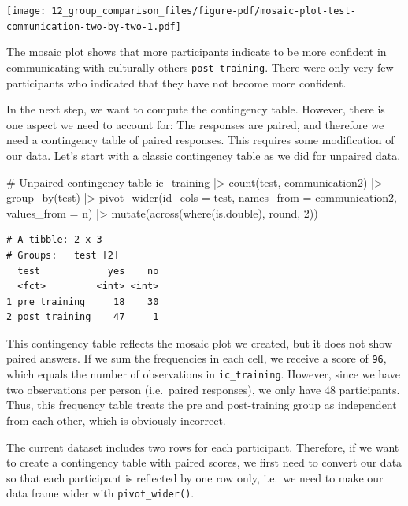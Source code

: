 \documentclass[
  letterpaper,
]{krantz}
\makeatletter
\newenvironment{Shaded}{\begin{snugshade}}{\end{snugshade}}
\newcommand{\AttributeTok}[1]{\textcolor[rgb]{0.40,0.45,0.13}{#1}}
\newcommand{\CommentTok}[1]{\textcolor[rgb]{0.37,0.37,0.37}{#1}}
\newcommand{\DecValTok}[1]{\textcolor[rgb]{0.68,0.00,0.00}{#1}}
\newcommand{\FunctionTok}[1]{\textcolor[rgb]{0.28,0.35,0.67}{#1}}
\newcommand{\NormalTok}[1]{\textcolor[rgb]{0.00,0.23,0.31}{#1}}
\newcommand{\SpecialCharTok}[1]{\textcolor[rgb]{0.37,0.37,0.37}{#1}}
\newenvironment{kframe}{%
\medskip{}
\setlength{\fboxsep}{.8em}
 \def\at@end@of@kframe{}%
 \ifinner\ifhmode%
  \def\at@end@of@kframe{\end{minipage}}%
  \begin{minipage}{\columnwidth}%
 \fi\fi%
 \def\FrameCommand##1{\hskip\@totalleftmargin \hskip-\fboxsep
 \colorbox{shadecolor}{##1}\hskip-\fboxsep
     \hskip-\linewidth \hskip-\@totalleftmargin \hskip\columnwidth}%
 \MakeFramed {\advance\hsize-\width
   \@totalleftmargin\z@ \linewidth\hsize
   \@setminipage}}%
 {\par\unskip\endMakeFramed%
 \at@end@of@kframe}
\renewenvironment{Shaded}{\begin{kframe}}{\end{kframe}}
\makeatother
\begin{document}
\texttt{[image: 12\_group\_comparison\_files/figure-pdf/mosaic-plot-test-communication-two-by-two-1.pdf]}

The mosaic plot shows that more participants indicate to be more
confident in communicating with culturally others
\texttt{post-training}. There were only very few participants who
indicated that they have not become more confident.

In the next step, we want to compute the contingency table. However,
there is one aspect we need to account for: The responses are paired,
and therefore we need a contingency table of paired responses. This
requires some modification of our data. Let's start with a classic
contingency table as we did for unpaired data.

\begin{Shaded}
\begin{Highlighting}[]
\CommentTok{\# Unpaired contingency table}
\NormalTok{ic\_training }\SpecialCharTok{|\textgreater{}}
  \FunctionTok{count}\NormalTok{(test, communication2) }\SpecialCharTok{|\textgreater{}}
  \FunctionTok{group\_by}\NormalTok{(test) }\SpecialCharTok{|\textgreater{}}
  \FunctionTok{pivot\_wider}\NormalTok{(}\AttributeTok{id\_cols =}\NormalTok{ test,}
              \AttributeTok{names\_from =}\NormalTok{ communication2,}
              \AttributeTok{values\_from =}\NormalTok{ n) }\SpecialCharTok{|\textgreater{}}
  \FunctionTok{mutate}\NormalTok{(}\FunctionTok{across}\NormalTok{(}\FunctionTok{where}\NormalTok{(is.double), round, }\DecValTok{2}\NormalTok{))}
\end{Highlighting}
\end{Shaded}

\begin{verbatim}
# A tibble: 2 x 3
# Groups:   test [2]
  test            yes    no
  <fct>         <int> <int>
1 pre_training     18    30
2 post_training    47     1
\end{verbatim}

This contingency table reflects the mosaic plot we created, but it does
not show paired answers. If we sum the frequencies in each cell, we
receive a score of \texttt{96}, which equals the number of observations
in \texttt{ic\_training}. However, since we have two observations per
person (i.e.~paired responses), we only have 48 participants. Thus, this
frequency table treats the pre and post-training group as independent
from each other, which is obviously incorrect.

The current dataset includes two rows for each participant. Therefore,
if we want to create a contingency table with paired scores, we first
need to convert our data so that each participant is reflected by one
row only, i.e.~we need to make our data frame wider with
\texttt{pivot\_wider()}.
\end{document}
